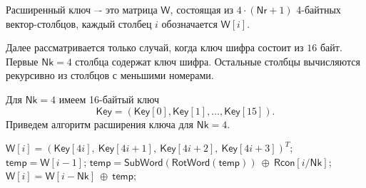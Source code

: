 Расширенный ключ –- это матрица $\mathsf{W}$, состоящая из $4 \cdot (\mathsf{Nr} + 1)$ 4-байтных вектор-столбцов, каждый столбец $i$ обозначается $\mathsf{W}[i]$.

Далее рассматривается только случай, когда ключ шифра состоит из $16$ байт. Первые $\mathsf{Nk} = 4$ столбца содержат ключ шифра. Остальные столбцы вычисляются рекурсивно из столбцов с меньшими номерами.

Для $\mathsf{Nk} = 4$ имеем 16-байтый ключ
\[
    \mathsf{Key} = (\mathsf{Key}[0], \mathsf{Key}[1], \dots, \mathsf{Key}[15]).
\]
Приведем алгоритм расширения ключа для $\mathsf{Nk} = 4$.
\begin{algorithm}[iht]
    \caption{$\mathsf{KeyExpansion}(\mathsf{Key}, \mathsf{W})$\label{alg:AES-key-exp}}
    \begin{algorithmic}
            \STATE $\mathsf{W}[i] = (\mathsf{Key}[4i], ~ \mathsf{Key}[4i+1], ~ \mathsf{Key}[4i+2], ~ \mathsf{Key}[4i+3])^T$;
        \ENDFOR
            \STATE $\mathsf{temp} = \mathsf{W}[i-1]$;
                \STATE $\mathsf{temp} = \mathsf{SubWord}(\mathsf{RotWord}(\mathsf{temp})) ~ \oplus ~ \mathsf{Rcon}[i / \mathsf{Nk}]$;
            \ENDIF
            \STATE $\mathsf{W}[i] = \mathsf{W}[i - \mathsf{Nk}] ~ \oplus ~ \mathsf{temp}$;
        \ENDFOR
    \end{algorithmic}
\end{algorithm}



